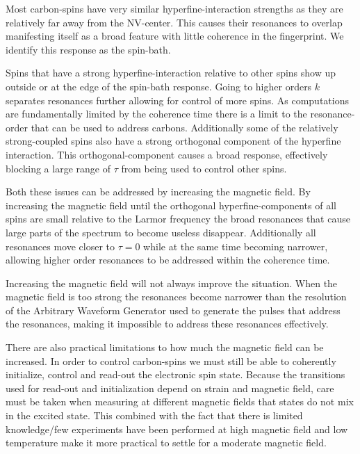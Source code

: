 Most carbon-spins have very similar hyperfine-interaction strengths as they are relatively far away from the NV-center. This causes their resonances to overlap manifesting itself as a broad feature with little coherence in the fingerprint. We identify this response as the spin-bath.

Spins that have a strong hyperfine-interaction relative to other spins show up outside or at the edge of the spin-bath response. Going to higher orders $k$ separates resonances further allowing for control of more spins. As computations are fundamentally limited by the coherence time there is a limit to the resonance-order that can be used to address carbons. Additionally some of the relatively strong-coupled spins also have a strong orthogonal component of the hyperfine interaction. This orthogonal-component causes a broad response, effectively blocking a large range of $\tau$ from being used to control other spins.

Both these issues can be addressed by increasing the magnetic field. By increasing the magnetic field until the orthogonal hyperfine-components of all spins are small relative to the Larmor frequency the broad resonances that cause large parts of the spectrum to become useless disappear. Additionally all resonances move closer to $\tau =0$ while at the same time becoming narrower, allowing higher order resonances to be addressed within the coherence time. %

Increasing the magnetic field will not always improve the situation. When the magnetic field is too strong the resonances become narrower than the resolution of the Arbitrary Waveform Generator used to generate the pulses that address the resonances, making it impossible to address these resonances effectively.

There are also practical limitations to how much the magnetic field can be increased. In order to control carbon-spins we must still be able to coherently initialize, control and read-out the electronic spin state. Because the transitions used for read-out and initialization depend on strain and magnetic field\citep{Hensen2011MeasurementBased}, care must be taken when measuring at different magnetic fields that states do not mix in the excited state.
This combined with the fact that there is limited knowledge/few experiments have been performed at high magnetic field and low temperature make it more practical to settle for a moderate magnetic field.





